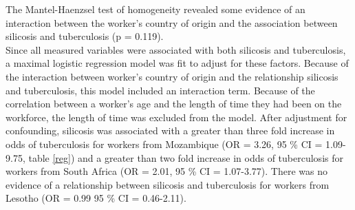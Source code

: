 \documentclass[11pt,a4paper,twoside]{article}\usepackage{graphicx, color}
\begin{document}
The Mantel-Haenzsel test of homogeneity revealed some evidence of an interaction between the worker's country of origin and the association between silicosis and tuberculosis (p = 0.119). \\ \indent
Since all measured variables were associated with both silicosis and tuberculosis, a maximal logistic regression model was fit to adjust for these factors. 
Because of the interaction between worker's country of origin and the relationship silicosis and tuberculosis, this model included an interaction term. 
Because of the correlation between a worker's age and the length of time they had been on the workforce, the length of time was excluded from the model. 
After adjustment for confounding, silicosis was associated with a greater than three fold increase in odds of tuberculosis for workers from Mozambique (OR = 3.26, 95 \% CI = 1.09-9.75, table \ref{reg}) and a greater than two fold increase in odds of tuberculosis for workers from South Africa (OR = 2.01, 95 \% CI = 1.07-3.77). 
There was no evidence of a relationship between silicosis and tuberculosis for workers from Lesotho (OR = 0.99 95 \% CI = 0.46-2.11).
\end{document}
